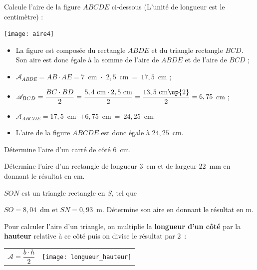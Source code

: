 \begin{methode*1}
\begin{exemple*1}
Calcule l'aire de la figure $ABCDE$ ci‑dessous (L'unité de longueur est le centimètre) :
\begin{center}  \texttt{[image: aire4]} \end{center}

 \begin{itemize}
  \item La figure est composée du rectangle $ABDE$ et du triangle rectangle $BCD$. Son aire est donc égale à la somme de l'aire de $ABDE$ et de l'aire de $BCD$ ;
  \item $\mathcal{A}_{ABDE} = AB \cdot AE = 7$ cm $\cdot$ $2,5$ cm = $17,5$ cm ; \\[0.2em]
  \item $\mathcal{A}_{BCD} = \dfrac{BC \cdot BD}{2} = \dfrac{5,4 \text{ cm} \cdot 2,5 \text{ cm}}{2} = \dfrac{13,5 \text{ cm}\up{2}}{2} = 6,75 $ cm ;\\[0.2em]
  \item $\mathcal{A}_{ABCDE} = 17,5$ cm $+ 6,75$ cm = $24,25$ cm.
  \item L'aire de la figure $ABCDE$ est donc égale à $24,25$ cm.
  \end{itemize}
\end{exemple*1}

\exercice 
Détermine l'aire d'un carré de côté 6 cm. 

\exercice 
Détermine l'aire d'un rectangle de longueur 3 cm et de largeur 22 mm en donnant le résultat en cm.
     
\exercice 
$SON$ est un triangle rectangle en $S$, tel que 

$SO = 8,04$ dm et $SN = 0,93$ m. Détermine son aire en donnant le résultat en m.
 
\end{methode*1}
\newpage

\vspace{2em}

\begin{aconnaitre}
Pour calculer l’aire d’un triangle, on multiplie la \textbf{\textcolor{H1}{longueur d'un côté}} par la \textbf{\textcolor{C2}{hauteur}} relative à ce côté puis on divise le résultat par 2 :

\begin{tabularx}{\textwidth}{XX}
{\large $\mathcal{A} = \dfrac{b \cdot h}{2}$} & \texttt{[image: longueur\_hauteur]} \\
 \end{tabularx} \\
 \end{aconnaitre}

